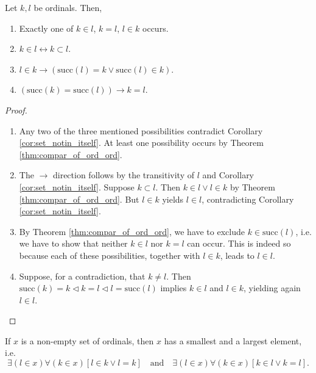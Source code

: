 \begin{lemma}
    \label{lem:four}
    \leanok
    Let $k,l$ be ordinals. Then,
    \begin{enumerate}
        \item Exactly one of $k\in l$, $k=l$, $l \in k$ occurs.
        \item $k\in l \leftrightarrow k \subset l$.
        \item $l \in k \rightarrow (\text{succ}(l)=k \lor \text{succ}(l)\in k)$.
        \item $(\text{succ}(k) = \text{succ}(l) )\rightarrow k = l$.
    \end{enumerate}
\end{lemma}

\begin{proof}
    \leanok
    \leavevmode
    \begin{enumerate}
        \item Any two of the three mentioned possibilities contradict Corollary \ref{cor:set_notin_itself}. 
        At least one possibility occurs by Theorem \ref{thm:compar_of_ord_ord}.
        \item The $\rightarrow$ direction follows by the transitivity of $l$ and Corollary \ref{cor:set_notin_itself}. 
        Suppose $k \subset l$. Then $k \in l \lor l \in k$ by Theorem \ref{thm:compar_of_ord_ord}. 
        But $l \in k$ yields $l \in l$, contradicting Corollary \ref{cor:set_notin_itself}.
        \item By Theorem \ref{thm:compar_of_ord_ord}, we have to exclude $k \in \text{succ}(l)$, i.e. we have to show that neither $k\in l$ nor $k=l$ can occur. 
        This is indeed so because each of these possibilities, together with $l\in k$, leads to $l \in l$.
        \item Suppose, for a contradiction, that $k \neq l$. 
        Then $\text{succ}(k) = k \lhd k = l \lhd l = \text{succ}(l)$ implies $k \in l$ and $l \in k$, yielding again $l \in l$.
    \end{enumerate}
\end{proof}

\begin{lemma}
    \label{lem:exists_max_of_set_of_ord+exists_min_of_set_of_ord}
    If $x$ is a non-empty set of ordinals, then $x$ has a smallest and a largest element, i.e.
    \begin{equation*}
    \exists(l \in x) \forall (k \in x) [l \in k \lor l = k]\quad\text{and}\quad\exists(l \in x) \forall (k \in x) [k \in l \lor k = l].
    \end{equation*}
\end{lemma}

